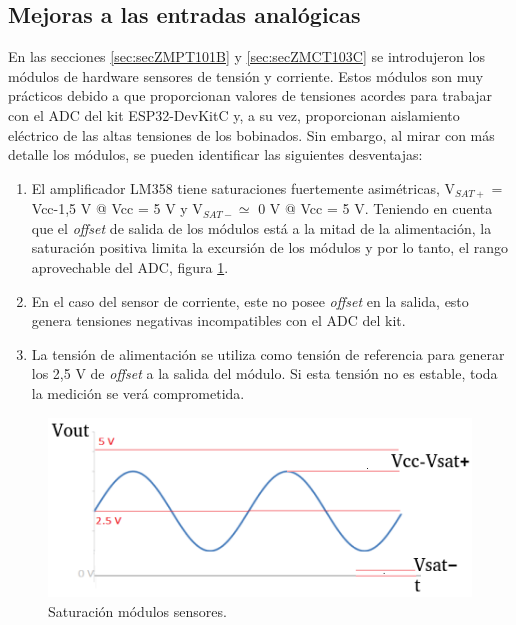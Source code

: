 \subsection{Mejoras a las entradas analógicas}
\label{subsec:mejorasAnalo}
En las secciones \ref{sec:secZMPT101B} y \ref{sec:secZMCT103C} se introdujeron los módulos de hardware sensores de tensión y corriente. Estos módulos son muy prácticos debido a que proporcionan valores de tensiones acordes para trabajar con el ADC del kit ESP32-DevKitC y, a su vez, proporcionan aislamiento eléctrico de las altas tensiones de los bobinados. Sin embargo, al mirar con más detalle los módulos, se pueden identificar las siguientes desventajas:
\begin{enumerate}
\item El amplificador LM358 tiene saturaciones fuertemente asimétricas, V$_{SAT+}$ = Vcc-1,5 V @ Vcc = 5 V y V$_{SAT-} \simeq $  0 V @ Vcc = 5 V. Teniendo en cuenta que el \textit{offset} de salida de los módulos está a la mitad de la alimentación, la saturación positiva limita la excursión de los módulos y por lo tanto, el rango aprovechable del ADC, figura \ref{fig:sensSat}. 
\item En el caso del sensor de corriente, este no posee \textit{offset} en la salida, esto genera tensiones negativas incompatibles con el ADC del kit.
\item La tensión de alimentación se utiliza como tensión de referencia para generar los 2,5 V de \textit{offset} a la salida del módulo. Si esta tensión no es estable, toda la medición se verá comprometida.
\end{enumerate}

\begin{figure}[htpb]
	\centering
	\includegraphics[scale=1]{./Figures/ZMPT101B_waves_sat.png}
	\caption{Saturación módulos sensores.}
	\label{fig:sensSat}
\end{figure}

